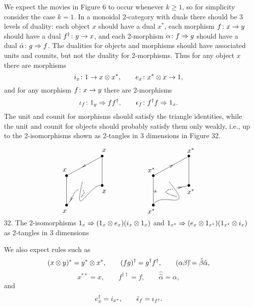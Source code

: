 We expect the movies in Figure 6 to occur whenever $k \ge 1$, so
for simplicity consider the case $k = 1$.
In a monoidal 2-category with duals
there should be 3 levels of duality: each object $x$ should have
a dual $x^\ast$,  each morphism $f \colon x \to y$ should have a
dual $f^\dagger \colon y \to x$, and each 2-morphism $\alpha \colon
f \Rightarrow g$ should have a dual $\hat \alpha \colon g
\Rightarrow f$.   The dualities for objects and morphisms should
have associated units and counits, but not the duality for
2-morphisms.  Thus for any object $x$ there are morphisms
\[      i_x \colon 1 \to x \otimes x^\ast, \qquad
        e_x \colon x^\ast \otimes x \to 1 ,\]
and for any morphism $f \colon x \to y$ there are 2-morphisms
\[   \iota_f \colon 1_y \Rightarrow ff^\dagger, \qquad
     \epsilon_f \colon f^\dagger f \Rightarrow 1_x .\]
The unit and counit for morphisms should satisfy the triangle
identities, while the unit and counit for objects should probably satisfy
them only weakly, i.e., up to the 2-isomorphisms shown as
2-tangles in 3 dimensions in Figure 32.


\bfig 
\[
 \xy 
 (-8,-15)*{\bullet}="BB"+(-1,-3)*{x};
 (-8,0)*{\bullet}="BT"+(-1,3)*{x};
 (10,-5)*{\bullet}="TB"+(1,-3)*{x};
 (10,10)*{\bullet}="TT"+(1,3)*{x};
 (0,-3)*{}="F";
 "BT";"TT" **\dir{-}; ?(.45)*\dir{<};
 "TB";"F" **\crv{(4,-3) & (-5, -25)} \POS?(.92)*{\hole}="J1"; \POS?(.78)*{\hole}="J2";
 "BB";"BT" **\dir{-};
 "TT";"TB" **\dir{-};
 "BB";"J1" **\crv{(-5,-13) & (-4,-5)}; ?(.25)*\dir{<};
  "J2";"J1" **\crv{~*=<2pt>{.} (3,-7)};
 \endxy
\qquad \qquad \qquad
 \xy
 (-8,-15)*{\bullet}="BB"+(-1,-3)*{x^{\ast}};
 (-8,0)*{\bullet}="BT"+(-1,3)*{x^{\ast}};
 (10,-5)*{\bullet}="TB"+(1,-3)*{x^{\ast}};
 (10,10)*{\bullet}="TT"+(1,3)*{x^{\ast}};
 (0,-3)*{}="F";
  "BB";"BT" **\dir{-};
 "TT";"TB" **\dir{-};
 "BT";"TT" **\dir{-}; ?(.55)*\dir{>};
 "BB";"F" **\crv{(-5,-7) & (14, -20)} \POS?(.92)*{\hole}="J2";
 \POS?(.75)*{\hole}="J1";
 "TB";"J2" **\crv{}; ?(.5)*\dir{<};
  "J1";"J2" **\crv~pC{~*=<2pt>{.} (-7,-8)};
 \endxy
\]
32.  The 2-isomorphisms $1_x \Rightarrow (1_x \otimes e_x)(i_x
\otimes 1_x)$ and $1_{x^\ast} \Rightarrow (e_x \otimes
1_{x^\ast})(1_{x^\ast} \otimes i_x)$ \break as 2-tangles in 3 dimensions
\efig

We also expect rules such as
\[    (x \otimes y)^\ast = y^\ast \otimes x^\ast, \qquad
       (fg)^\dagger = g^\dagger f^\dagger, \qquad
       (\alpha\beta)\hat{} = \hat\beta \hat\alpha ,\]
\[    x^{\ast\ast} = x, \qquad f^{\dagger\dagger} = f, \qquad
\hat{\hat\alpha} = \alpha, \]
and
\[   e_x^\dagger = i_{x^\ast},\qquad \hat {\epsilon}_f = \iota_{f^\dagger}.\]

